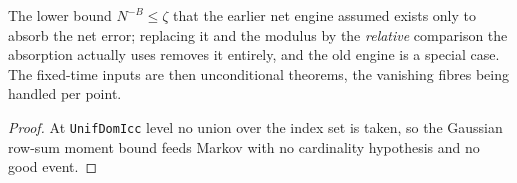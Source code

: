 \begin{lemma}\label{lem:ldeflow}
  \leanok{}
  The lower bound $N^{-B}\le\zeta$ that the earlier net engine assumed exists only to absorb the net
  error; replacing it and the modulus by the \emph{relative} comparison the absorption actually uses
  removes it entirely, and the old engine is a special case. The fixed-time inputs are then
  unconditional theorems, the vanishing fibres being handled per point.
\end{lemma}
\begin{proof}\leanok
  At \texttt{UnifDomIcc} level no union over the index set is taken, so the Gaussian row-sum moment
  bound feeds Markov with no cardinality hypothesis and no good event.
\end{proof}

